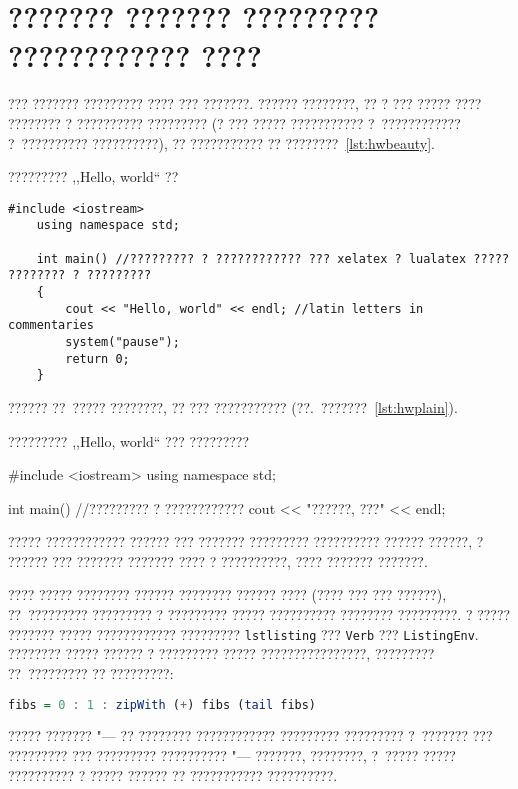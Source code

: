 \chapter{??????? ??????? ????????? ???????????? ????}\label{app:A}

??? ??????? ????????? ???? ??? ???????. ?????? ????????, ?? ? ??? ????? ????
???????? ? ?????????? ????????? (? ??? ????? ??????????? ?~????????????
?~?????????? ??????????), ?? ??????????? ?? ????????~\cref{lst:hwbeauty}.
\begin{ListingEnv}[!h]%
    \captiondelim{ } %
    \caption{????????? ,,Hello, world`` ?? \protect\cpp}\label{lst:hwbeauty}
    \begin{lstlisting}[language={[ISO]C++}]
	#include <iostream>
	using namespace std;

	int main() //????????? ? ???????????? ??? xelatex ? lualatex ????? ???????? ? ?????????
	{
		cout << "Hello, world" << endl; //latin letters in commentaries
		system("pause");
		return 0;
	}
    \end{lstlisting}
\end{ListingEnv}%
?????? ??~????? ????????, ?? ??? ??????????? (??.~???????~\cref{lst:hwplain}).
\begin{ListingEnv}[!h]
    \captiondelim{ } %
    \caption{????????? ,,Hello, world`` ??? ?????????}\label{lst:hwplain}
    \begin{Verb}

        #include <iostream>
        using namespace std;

        int main() //????????? ? ????????????
        {
            cout << "??????, ???" << endl;
        }
    \end{Verb}
\end{ListingEnv}

????? ???????????? ?????? ??? ??????? ????????? ??????????
?????? ??????, ? ?????? ??? ??????? ???????
???? ? ??????????, ???? ??????? ???????.

???? ????? ???????? ?????? ???????? ?????? ???? (???? ??? ??? ??????),
??~?????????  ????????? ? ????????? ????? ?????????? ???????? ?????????.
? ????? ??????? ????? ???????????? ????????? \texttt{lstlisting} ???
\texttt{Verb} ??? \texttt{ListingEnv}. ???????? ????? ??????
? ????????? ????? ????????????????, ????????? ??~????????? ?? ?????????:
\begin{lstlisting}[language=Haskell]
fibs = 0 : 1 : zipWith (+) fibs (tail fibs)
\end{lstlisting}
????? ??????? "--- ?? ???????? ???????????? ????????? ?????????
?~??????? ??? ????????? ??? ????????? ?????????? "--- ???????,
????????, ?~????? ????? ?????????? ? ????? ?????? ?? ???????????
??????????.

